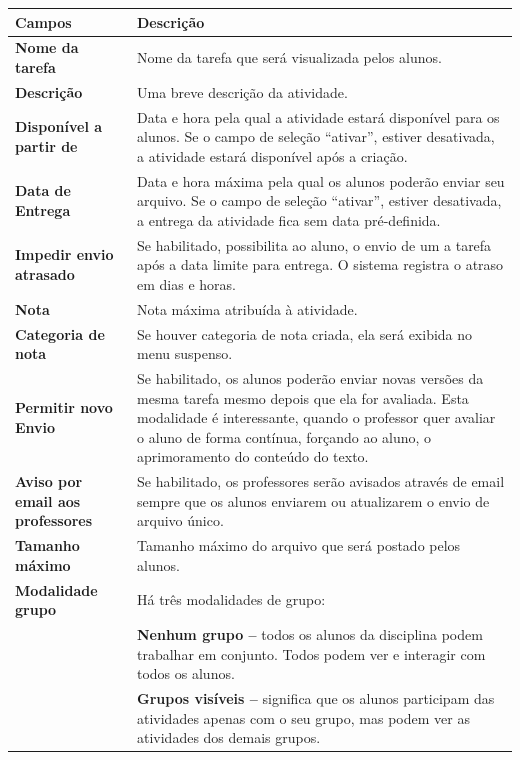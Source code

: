 \begin{longtable}{p{6cm}|p{9cm}}
     \hline
     \rowcolor[rgb]{0.8,0.8,0.8} \textbf{Campos} &  \textbf{Descrição}\\\hline
    \textbf{Nome da tarefa} & Nome da tarefa que será visualizada pelos alunos.\\\hline
    \textbf{Descrição} & Uma breve descrição da atividade. \\\hline
    \textbf{Disponível a partir de} & Data e hora pela qual a atividade estará disponível para os alunos. Se o campo de seleção “ativar”, estiver desativada, a atividade estará disponível após a criação. \\\hline
    \textbf{Data de Entrega} & Data e hora máxima pela qual os alunos poderão enviar seu arquivo. Se o campo de seleção “ativar”, estiver desativada, a entrega da atividade fica sem data pré-definida. \\\hline
    \textbf{Impedir envio atrasado} & Se habilitado, possibilita ao aluno, o envio de um a tarefa após a data limite para entrega. O sistema registra o atraso em dias e horas.\\\hline
    \textbf{Nota} &  Nota máxima atribuída à atividade.\\\hline
    \textbf{Categoria de nota} & Se houver categoria de nota criada, ela será exibida no menu suspenso.\\\hline
    \textbf{Permitir novo Envio} & Se habilitado, os alunos poderão enviar novas versões da mesma tarefa mesmo depois que ela for avaliada. Esta modalidade é interessante, quando o professor quer avaliar o aluno de forma contínua, forçando ao aluno, o aprimoramento do conteúdo do texto.\\\hline
    \textbf{Aviso por email aos professores} & Se habilitado, os professores serão avisados através de email sempre que os alunos enviarem ou atualizarem o envio de arquivo único.        \\\hline
    \textbf{Tamanho máximo} & Tamanho máximo do arquivo que será postado pelos alunos.\\\hline
    \textbf{Modalidade grupo} & Há três modalidades de grupo:\\
&\textbf{Nenhum grupo –} todos os alunos da disciplina podem trabalhar em conjunto. Todos podem ver e interagir com todos os  alunos. \\
&\textbf{Grupos visíveis –} significa que os alunos participam das atividades apenas com o seu grupo, mas podem ver as atividades dos demais grupos.\\

\end{longtable}
